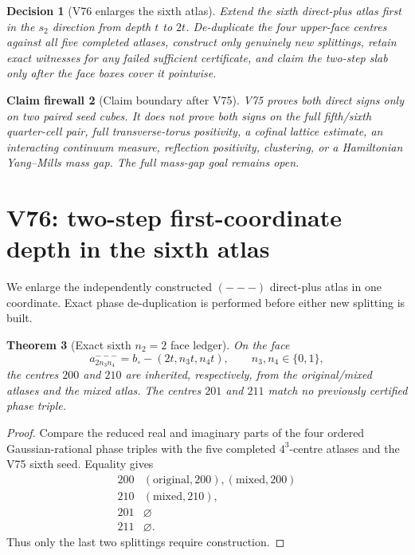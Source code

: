 \documentclass[11pt,oneside]{article}
\newtheorem{theorem}{Theorem}[section]
\newtheorem{firewall}[theorem]{Claim firewall}
\newtheorem{decision}[theorem]{Decision}
\theoremstyle{definition}
\theoremstyle{remark}
\begin{document}
\begin{decision}[V76 enlarges the sixth atlas]
\label{dec:newv75-next}
Extend the sixth direct-plus atlas first in the \(s_2\) direction
from depth \(t\) to \(2t\).  De-duplicate the four upper-face
centres against all five completed atlases, construct only genuinely
new splittings, retain exact witnesses for any failed sufficient
certificate, and claim the two-step slab only after the face boxes
cover it pointwise.
\end{decision}

\begin{firewall}[Claim boundary after V75]
\label{fire:newv75-final}
V75 proves both direct signs only on two paired seed cubes.  It does
not prove both signs on the full fifth/sixth quarter-cell pair,
full transverse-torus positivity, a cofinal lattice estimate, an
interacting continuum measure, reflection positivity, clustering,
or a Hamiltonian Yang--Mills mass gap.  The full mass-gap goal
remains open.
\end{firewall}

\section{V76: two-step first-coordinate depth in the sixth atlas}
\label{sec:newv76-sixth-first-two-step}

We enlarge the independently constructed \((---)\) direct-plus
atlas in one coordinate.  Exact phase de-duplication is performed
before either new splitting is built.

\begin{theorem}[Exact sixth \(n_2=2\) face ledger]
\label{thm:newv76-intersections}
On the face
\[
 a^{---}_{2n_3n_4}=b_\circ-(2t,n_3t,n_4t),
 \qquad n_3,n_4\in\{0,1\},                              \tag{76.1}
\]
the centres \(200\) and \(210\) are inherited, respectively, from
the original/mixed atlases and the mixed atlas.  The centres \(201\)
and \(211\) match no previously certified phase triple.
\end{theorem}

\begin{proof}
Compare the reduced real and imaginary parts of the four ordered
Gaussian-rational phase triples with the five completed
\(4^3\)-centre atlases and the V75 sixth seed.  Equality gives
\[
\begin{array}{c|l}
200&(\mathrm{original},200),(\mathrm{mixed},200)\\
210&(\mathrm{mixed},210),\\
201&\varnothing\\
211&\varnothing.
\end{array}                                             \tag{76.2}
\]
Thus only the last two splittings require construction.
\end{proof}
\end{document}
